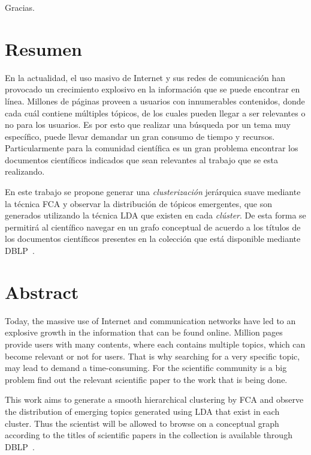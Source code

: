 \documentclass[12pt,oneside,letterpaper]{book}
\newcommand{\eng}[1]{\textit{#1}\xspace}			%
\newcommand{\abr}[1]{\textsc{#1}\xspace}           %
\theoremstyle{definition}
\begin{document}
Gracias.


\clearpage

\section*{Resumen}
\thispagestyle{empty}
En la actualidad, el uso masivo de Internet y sus redes de comunicación han provocado un crecimiento explosivo en la información que se puede encontrar en línea. Millones de páginas proveen a usuarios con innumerables contenidos, donde cada cuál contiene múltiples tópicos, de los cuales pueden llegar a ser relevantes o no para los usuarios. Es por esto que realizar una búsqueda por un tema muy específico, puede llevar demandar un gran consumo de tiempo y recursos. Particularmente para la comunidad científica es un gran problema encontrar los documentos científicos indicados que sean relevantes al trabajo que se esta realizando.

En este trabajo se propone generar una \eng{clusterización} jerárquica suave mediante la técnica \abr{FCA} y observar la distribución de tópicos emergentes, que son generados utilizando la técnica \abr{LDA} que existen en cada \eng{clúster}. De esta forma se permitirá al científico navegar en un grafo conceptual de acuerdo a los títulos de los documentos científicos presentes en la colección que está disponible mediante \abr{DBLP}~\cite{DBLPLey2002}.
\clearpage

\section*{Abstract}
\thispagestyle{empty}
Today, the massive use of Internet and communication networks have led to an explosive growth in the information that can be found online. Million pages provide users with many contents, where each contains multiple topics, which can become relevant or not for users. That is why searching for a very specific topic, may lead to demand a time-consuming. For the scientific community is a big problem find out the relevant scientific paper to the work that is being done.

This work aims to generate a smooth hierarchical clustering by \abr{FCA} and observe the distribution of emerging topics generated using  \abr{LDA} that exist in each cluster. Thus the scientist will be allowed to browse on a conceptual graph according to the titles of scientific papers in the collection is available through \abr{DBLP}~\cite{DBLPLey2002}.
\clearpage
\end{document}
